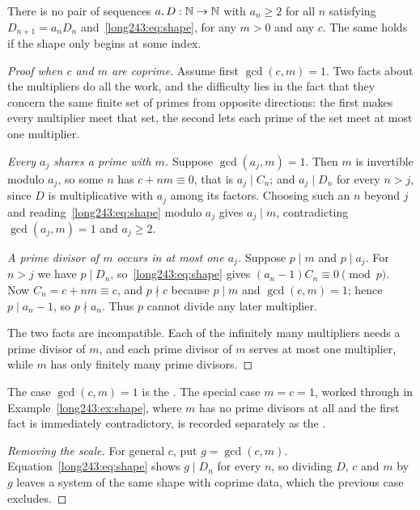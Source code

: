 \documentclass[11pt]{article}
\begin{document}
\begin{theorem}\label{long243:res:constant}
There is no pair of sequences $a,D:\mathbb{N}\to\mathbb{N}$ with $a_n\ge2$ for all $n$
satisfying $D_{n+1}=a_nD_n$ and~\eqref{long243:eq:shape}, for any $m>0$ and any
$c$.  The same holds if the shape only begins at some index.
\end{theorem}

\begin{proof}[Proof when $c$ and $m$ are coprime]
Assume first $\gcd(c,m)=1$.  Two facts about the multipliers do all the work,
and the difficulty lies in the fact that they concern the same finite set of
primes from opposite directions: the first makes every multiplier meet that
set, the second lets each prime of the set meet at most one multiplier.

\emph{Every $a_j$ shares a prime with $m$.}  Suppose $\gcd(a_j,m)=1$.  Then
$m$ is invertible modulo $a_j$, so some $n$ has $c+nm\equiv0$, that is
$a_j\mid C_n$; and $a_j\mid D_n$ for every $n>j$, since $D$ is multiplicative
with $a_j$ among its factors.  Choosing such an $n$ beyond $j$
and reading~\eqref{long243:eq:shape} modulo $a_j$ gives $a_j\mid m$, contradicting
$\gcd(a_j,m)=1$ and $a_j\ge2$.

\emph{A prime divisor of $m$ occurs in at most one $a_j$.}  Suppose $p\mid m$
and $p\mid a_j$.  For $n>j$ we have $p\mid D_n$, so~\eqref{long243:eq:shape} gives
$(a_n-1)C_n\equiv0 \pmod p$.  Now $C_n=c+nm\equiv c$, and $p\nmid c$ because
$p\mid m$ and $\gcd(c,m)=1$; hence $p\mid a_n-1$, so $p\nmid a_n$.  Thus $p$
cannot divide any later multiplier.

The two facts are incompatible.  Each of the infinitely many multipliers needs
a prime divisor of $m$, and each prime divisor of $m$ serves at most one
multiplier, while $m$ has only finitely many prime divisors.
\end{proof}

\noindent The case $\gcd(c,m)=1$ is the
.  The special case $m=c=1$, worked through in
Example~\ref{long243:ex:shape}, where $m$ has no prime divisors at all and the first
fact is immediately contradictory, is recorded separately as the
.

\begin{proof}[Removing the scale]
For general $c$, put $g=\gcd(c,m)$.  Equation~\eqref{long243:eq:shape} shows
$g\mid D_n$ for every $n$, so dividing $D$, $c$ and $m$ by $g$ leaves a system
of the same shape with coprime data, which the previous case excludes.
\end{proof}
\end{document}
